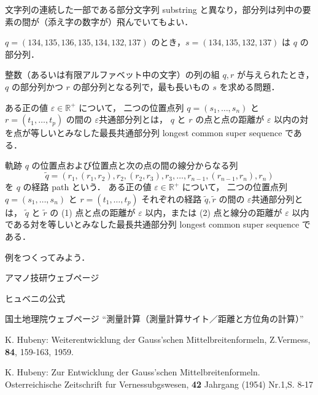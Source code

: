 \documentclass[11pt]{jarticle}
\begin{document}
文字列の連続した一部である部分文字列 substring と異なり，部分列は列中の要素の間が（添え字の数字が）飛んでいてもよい．

\begin{example}
$q = (134, 135, 136, 135, 134, 132, 137)$ のとき，$s = (134, 135, 132, 137)$ は $q$ の部分列．
\end{example}

\begin{defn}
整数（あるいは有限アルファベット中の文字）の列の組 $q, r$ が与えられたとき，
$q$ の部分列かつ $r$ の部分列となる列で，最も長いもの $s$ を求める問題．
\end{defn}

\begin{defn}[2つの位置点列の最長共通部分列 (I)]
ある正の値 $\varepsilon \in \mathbb{R}^+$ について，
二つの位置点列 $q = (s_1, \ldots, s_n)$ と $r = (t_1, \ldots, t_p)$ の間の $\varepsilon$共通部分列とは，
 $q$ と $r$ の点と点の距離が $\varepsilon$ 以内の対を点が等しいとみなした最長共通部分列 longest common super sequence である．
\end{defn}

\begin{defn}[2つの位置点列の最長共通部分列 (II)]
軌跡 $q$ の位置点および位置点と次の点の間の線分からなる列
\[
\tilde{q} = (r_1, (r_1, r_2), r_2, (r_2, r_3), r_3, \ldots, r_{n-1}, (r_{n-1}, r_n), r_n)
\]
を $q$ の経路 path という．
ある正の値 $\varepsilon \in \mathbb{R}^+$ について，
二つの位置点列 $q = (s_1, \ldots, s_n)$ と $r = (t_1, \ldots, t_p)$ それぞれの経路 $\tilde{q}, \tilde{r}$ の間の $\varepsilon$共通部分列とは，
 $\tilde{q}$ と $\tilde{r}$ の (1) 点と点の距離が $\varepsilon$ 以内，または (2) 点と線分の距離が $\varepsilon$ 以内である対を等しいとみなした最長共通部分列 longest common super sequence である．
\end{defn}

\begin{example}
例をつくってみよう．
\end{example}

\begin{thebibliography}{4}

アマノ技研ウェブページ

ヒュベニの公式

国土地理院ウェブページ ``測量計算（測量計算サイト／距離と方位角の計算）''

K. Hubeny: 
\newblock Weiterentwicklung der Gauss'schen Mittelbreitenformeln, Z.Vermess, {\bf 84}, 159-163, 1959.

K. Hubeny: 
\newblock
Zur Entwicklung der Gauss'schen Mittelbreitenformeln. Osterreichische Zeitschrift fur Vernessubgswesen, {\bf 42} Jahrgang (1954) Nr.1,S. 8-17

\end{thebibliography}
\end{document}

